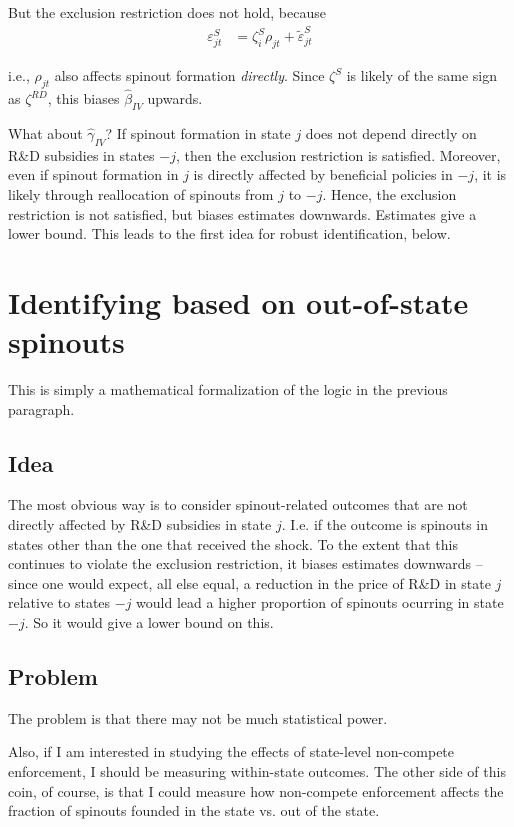 \documentclass[11pt,english]{article}
\theoremstyle{remark}
\begin{document}
But the exclusion restriction does not hold, because
\begin{align*}
	\varepsilon_{jt}^S &= \zeta_i^S \rho_{jt} + \tilde{\varepsilon}^S_{jt}
\end{align*}

i.e., $\rho_{jt}$ also affects spinout formation \textit{directly}. Since $\zeta^S$ is likely of the same sign as $\zeta^{RD}$, this biases $\hat{\beta}_{IV}$ upwards.

What about $\hat{\gamma}_{IV}$? If spinout formation in state $j$ does not depend directly on R\&D subsidies in states $-j$, then the exclusion restriction is satisfied. Moreover, even if spinout formation in $j$ is directly affected by beneficial policies in $-j$, it is likely through reallocation of spinouts from $j$ to $-j$. Hence, the exclusion restriction is not satisfied, but biases estimates downwards. Estimates give a lower bound. This leads to the first idea for robust identification, below.

\section{Identifying based on out-of-state spinouts}

This is simply a mathematical formalization of the logic in the previous paragraph.

\subsection{Idea}
The most obvious way is to consider spinout-related outcomes that are not directly affected by R\&D subsidies in state $j$. I.e. if the outcome is spinouts in states other than the one that received the shock. To the extent that this continues to violate the exclusion restriction, it biases estimates downwards -- since one would expect, all else equal, a reduction in the price of R\&D in state $j$ relative to states $-j$ would lead a higher proportion of spinouts ocurring in state $-j$. So it would give a lower bound on this. 

\subsection{Problem}
The problem is that there may not be much statistical power. 

Also, if I am interested in studying the effects of state-level non-compete enforcement, I should be measuring within-state outcomes. The other side of this coin, of course, is that I could measure how non-compete enforcement affects the fraction of spinouts founded in the state vs. out of the state.
\end{document}
